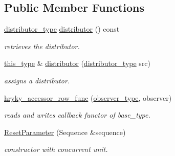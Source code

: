 \subsection*{Public Member Functions}
\begin{DoxyCompactItemize}
\item 
\hypertarget{structhryky_1_1task_1_1worker_1_1_batch_1_1_reset_parameter_aa448f6efc9247a5912c75cbd8e46097a}{\hyperlink{classhryky_1_1task_1_1distributor_1_1_batch}{distributor\-\_\-type} \hyperlink{structhryky_1_1task_1_1worker_1_1_batch_1_1_reset_parameter_aa448f6efc9247a5912c75cbd8e46097a}{distributor} () const }\label{structhryky_1_1task_1_1worker_1_1_batch_1_1_reset_parameter_aa448f6efc9247a5912c75cbd8e46097a}

\begin{DoxyCompactList}\small\item\em retrieves the distributor. \end{DoxyCompactList}\item 
\hypertarget{structhryky_1_1task_1_1worker_1_1_batch_1_1_reset_parameter_a9837d724a7788277630623c38979b2fe}{\hyperlink{classhryky_1_1_noncopyable_acf13ad1c98a76247a561dff514979da5}{this\-\_\-type} \& \hyperlink{structhryky_1_1task_1_1worker_1_1_batch_1_1_reset_parameter_a9837d724a7788277630623c38979b2fe}{distributor} (\hyperlink{classhryky_1_1task_1_1distributor_1_1_batch}{distributor\-\_\-type} src)}\label{structhryky_1_1task_1_1worker_1_1_batch_1_1_reset_parameter_a9837d724a7788277630623c38979b2fe}

\begin{DoxyCompactList}\small\item\em assigns a distributor. \end{DoxyCompactList}\item 
\hypertarget{structhryky_1_1task_1_1worker_1_1_batch_1_1_reset_parameter_a14f41998c0d27a87e193f5e376a6c452}{\hyperlink{structhryky_1_1task_1_1worker_1_1_batch_1_1_reset_parameter_a14f41998c0d27a87e193f5e376a6c452}{hryky\-\_\-accessor\-\_\-row\-\_\-func} (\hyperlink{classhryky_1_1task_1_1worker_1_1_base_1_1_observer}{observer\-\_\-type}, observer)}\label{structhryky_1_1task_1_1worker_1_1_batch_1_1_reset_parameter_a14f41998c0d27a87e193f5e376a6c452}

\begin{DoxyCompactList}\small\item\em reads and writes callback functor of base\-\_\-type. \end{DoxyCompactList}\item 
\hyperlink{structhryky_1_1task_1_1worker_1_1_batch_1_1_reset_parameter_a7b681afced1b2cdb9077ee0b95f5f7bb}{Reset\-Parameter} (Sequence \&sequence)
\begin{DoxyCompactList}\small\item\em constructor with concurrent unit. \end{DoxyCompactList}\end{DoxyCompactItemize}


